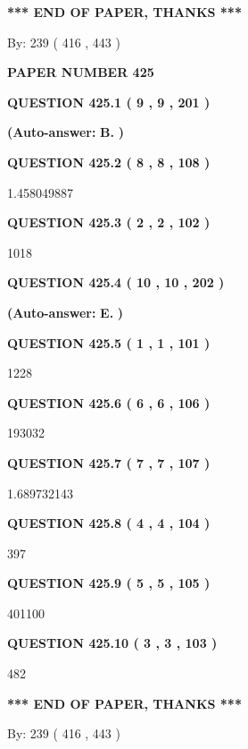 \documentclass{ctexart}
\begin{document}
   
\vspace{1.0in} 
{\textbf{\large{ *** END OF PAPER, THANKS *** }}} 
   
   
\hspace{1.0in} By: 
 239 ( 416 ,  443 )
   
   
   
   
\newpage 
\setcounter{page}{ 
   425001 } 
   
   
 {\textbf{ \Large{ PAPER NUMBER  425  }}}
   
   
   
   
  
  
{\textbf{\large{QUESTION
425.1 
 ( 9 , 9 , 201 )
}}}
 
 
{\textbf{(Auto-answer:}}
{\textbf{\large{
B.}}}
{\textbf{)}}
 
 
  
  
{\textbf{\large{QUESTION
425.2 
 ( 8 , 8 , 108 )
}}}

1.458049887
  
  
{\textbf{\large{QUESTION
425.3 
 ( 2 , 2 , 102 )
}}}

1018
  
  
{\textbf{\large{QUESTION
425.4 
 ( 10 , 10 , 202 )
}}}
 
 
{\textbf{(Auto-answer:}}
{\textbf{\large{
E.}}}
{\textbf{)}}
 
 
  
  
{\textbf{\large{QUESTION
425.5 
 ( 1 , 1 , 101 )
}}}

1228
  
  
{\textbf{\large{QUESTION
425.6 
 ( 6 , 6 , 106 )
}}}

193032
  
  
{\textbf{\large{QUESTION
425.7 
 ( 7 , 7 , 107 )
}}}

1.689732143
  
  
{\textbf{\large{QUESTION
425.8 
 ( 4 , 4 , 104 )
}}}

397
  
  
{\textbf{\large{QUESTION
425.9 
 ( 5 , 5 , 105 )
}}}

401100
  
  
{\textbf{\large{QUESTION
425.10 
 ( 3 , 3 , 103 )
}}}

482
   
   
   
   
\vspace{1.0in} 
{\textbf{\large{ *** END OF PAPER, THANKS *** }}} 
   
   
\hspace{1.0in} By: 
 239 ( 416 ,  443 )
   
\end{document}
